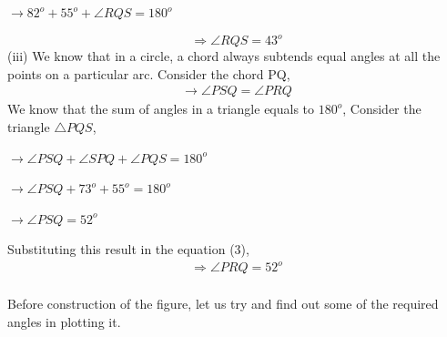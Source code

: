 \documentclass[journal,12pt,twocolumn]{IEEEtran}
\begin{document}
\begin{center}
    $\rightarrow 82^o + 55^o + \angle RQS = 180^o$
\end{center}
\begin{equation}
    \Rightarrow \angle RQS = 43^o
\end{equation}
(iii) We know that in a circle, a chord always subtends equal angles at all the points on a particular arc. Consider the chord PQ,
\begin{align}
    \rightarrow \angle PSQ = \angle PRQ
\end{align}
We know that the sum of angles in a triangle equals to $180^o$, Consider the triangle $\triangle PQS$,
\begin{center}
    $\rightarrow \angle PSQ + \angle SPQ + \angle PQS = 180^o$ 
\end{center}
\begin{center}
    $\rightarrow \angle PSQ + 73^o + 55^o = 180^o $
\end{center}
\begin{center}
    $\rightarrow \angle PSQ = 52^o$
\end{center}
Substituting this result in the equation (3),
\begin{align}
    \Rightarrow \angle PRQ = 52^o
\end{align}\\
Before construction of the figure, let us try and find out some of the required angles in plotting it.\\
\end{document}

